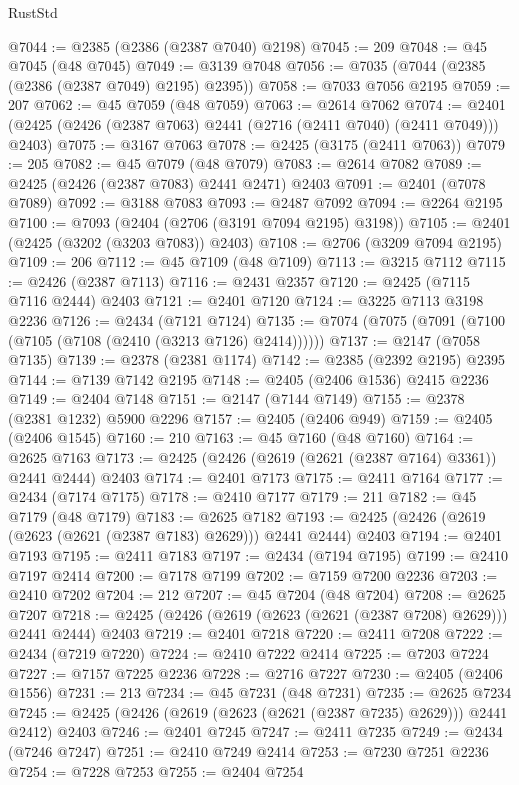 \begin{lexlean}{RustStd}
\begin{coremodule}
@7044 := @2385 (@2386 (@2387 @7040) @2198)
@7045 := 209
@7048 := @45 @7045 (@48 @7045)
@7049 := @3139 @7048
@7056 := @7035 (@7044 (@2385 (@2386 (@2387 @7049) @2195) @2395))
@7058 := @7033 @7056 @2195
@7059 := 207
@7062 := @45 @7059 (@48 @7059)
@7063 := @2614 @7062
@7074 := @2401 (@2425 (@2426 (@2387 @7063) @2441 (@2716 (@2411 @7040) (@2411 @7049))) @2403)
@7075 := @3167 @7063
@7078 := @2425 (@3175 (@2411 @7063))
@7079 := 205
@7082 := @45 @7079 (@48 @7079)
@7083 := @2614 @7082
@7089 := @2425 (@2426 (@2387 @7083) @2441 @2471) @2403
@7091 := @2401 (@7078 @7089)
@7092 := @3188 @7083
@7093 := @2487 @7092
@7094 := @2264 @2195
@7100 := @7093 (@2404 (@2706 (@3191 @7094 @2195) @3198))
@7105 := @2401 (@2425 (@3202 (@3203 @7083)) @2403)
@7108 := @2706 (@3209 @7094 @2195)
@7109 := 206
@7112 := @45 @7109 (@48 @7109)
@7113 := @3215 @7112
@7115 := @2426 (@2387 @7113)
@7116 := @2431 @2357
@7120 := @2425 (@7115 @7116 @2444) @2403
@7121 := @2401 @7120
@7124 := @3225 @7113 @3198 @2236
@7126 := @2434 (@7121 @7124)
@7135 := @7074 (@7075 (@7091 (@7100 (@7105 (@7108 (@2410 (@3213 @7126) @2414))))))
@7137 := @2147 (@7058 @7135)
@7139 := @2378 (@2381 @1174)
@7142 := @2385 (@2392 @2195) @2395
@7144 := @7139 @7142 @2195
@7148 := @2405 (@2406 @1536) @2415 @2236
@7149 := @2404 @7148
@7151 := @2147 (@7144 @7149)
@7155 := @2378 (@2381 @1232) @5900 @2296
@7157 := @2405 (@2406 @949)
@7159 := @2405 (@2406 @1545)
@7160 := 210
@7163 := @45 @7160 (@48 @7160)
@7164 := @2625 @7163
@7173 := @2425 (@2426 (@2619 (@2621 (@2387 @7164) @3361)) @2441 @2444) @2403
@7174 := @2401 @7173
@7175 := @2411 @7164
@7177 := @2434 (@7174 @7175)
@7178 := @2410 @7177
@7179 := 211
@7182 := @45 @7179 (@48 @7179)
@7183 := @2625 @7182
@7193 := @2425 (@2426 (@2619 (@2623 (@2621 (@2387 @7183) @2629))) @2441 @2444) @2403
@7194 := @2401 @7193
@7195 := @2411 @7183
@7197 := @2434 (@7194 @7195)
@7199 := @2410 @7197 @2414
@7200 := @7178 @7199
@7202 := @7159 @7200 @2236
@7203 := @2410 @7202
@7204 := 212
@7207 := @45 @7204 (@48 @7204)
@7208 := @2625 @7207
@7218 := @2425 (@2426 (@2619 (@2623 (@2621 (@2387 @7208) @2629))) @2441 @2444) @2403
@7219 := @2401 @7218
@7220 := @2411 @7208
@7222 := @2434 (@7219 @7220)
@7224 := @2410 @7222 @2414
@7225 := @7203 @7224
@7227 := @7157 @7225 @2236
@7228 := @2716 @7227
@7230 := @2405 (@2406 @1556)
@7231 := 213
@7234 := @45 @7231 (@48 @7231)
@7235 := @2625 @7234
@7245 := @2425 (@2426 (@2619 (@2623 (@2621 (@2387 @7235) @2629))) @2441 @2412) @2403
@7246 := @2401 @7245
@7247 := @2411 @7235
@7249 := @2434 (@7246 @7247)
@7251 := @2410 @7249 @2414
@7253 := @7230 @7251 @2236
@7254 := @7228 @7253
@7255 := @2404 @7254

\end{coremodule}
\end{lexlean}
